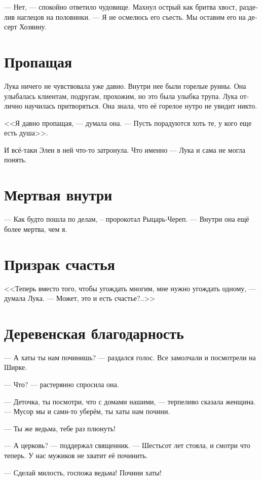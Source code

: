 \documentclass[a4paper,12pt,fleqn]{book}\usepackage{polyglossia}\setdefaultlanguage[babelshorthands=true]{russian}\setotherlanguage{english}\defaultfontfeatures{Ligatures=TeX,Mapping=tex-text}\usepackage{xcolor}\newcommand{\ml}[3]{#2}
\begin{document}
--- Нет, --- спокойно ответило чудовище.
Махнул острый как бритва хвост, разделив наглецов на половинки.
--- Я не осмелюсь его съесть.
Мы оставим его на десерт Хозяину.

\section{Пропащая}

Лука ничего не чувствовала уже давно.
Внутри нее были горелые руины.
Она улыбалась клиентам, подругам, прохожим, но это была улыбка трупа.
Лука отлично научилась притворяться.
Она знала, что её горелое нутро не увидит никто.

<<Я давно пропащая, --- думала она.
--- Пусть порадуются хоть те, у кого еще есть душа>>.

И всё-таки Элен в ней что-то затронула.
Что именно --- Лука и сама не могла понять.

\section{Мертвая внутри}

--- Как будто пошла по делам, -- пророкотал Рыцарь-Череп.
--- Внутри она ещё более мертва, чем я.

\section{Призрак счастья}

<<Теперь вместо того, чтобы угождать многим, мне нужно угождать одному, --- думала Лука.
--- Может, это и есть счастье?..>>

\section{Деревенская благодарность}

--- А хаты ты нам починишь? --- раздался голос. 
Все замолчали и посмотрели на Ширке.

--- Что? --- растерянно спросила она.

--- Деточка, ты посмотри, что с домами нашими, --- терпеливо сказала женщина.
--- Мусор мы и сами-то уберём, ты хаты нам почини.

--- Ты же ведьма, тебе раз плюнуть!

--- А церковь? --- поддержал священник. --- Шестьсот лет стояла, и смотри что теперь.
У нас мужиков не хватит её починить.

--- Сделай милость, госпожа ведьма!
Почини хаты!
\end{document}
